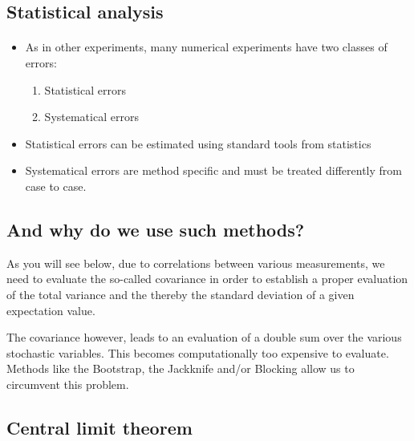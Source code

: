 \documentclass[%
oneside,                 %
final,                   %
10pt]{article}
\begin{document}
\noindent

    

\subsection{Statistical analysis}

\paragraph{}
\begin{itemize}
\item As in other experiments, many numerical  experiments have two classes of errors:
\begin{enumerate}

\item Statistical errors

\item Systematical errors

\end{enumerate}

\noindent
\item Statistical errors can be estimated using standard tools from statistics

\item Systematical errors are method specific and must be treated differently from case to case. 
\end{itemize}

\noindent

    

\subsection{And why do we use such methods?}

As you will see below, due to correlations between various
measurements, we need to evaluate the so-called covariance in order to
establish a proper evaluation of the total variance and the thereby
the standard deviation of a given expectation value.

The covariance however, leads to an evaluation of a double sum over the various stochastic variables. This becomes computationally too expensive to evaluate.
Methods like the Bootstrap, the Jackknife and/or Blocking allow us to circumvent this problem. 

\subsection{Central limit theorem}
\end{document}
